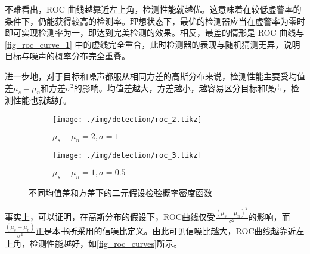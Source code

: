 不难看出，ROC 曲线越靠近左上角，检测性能就越优。这意味着在较低虚警率的条件下，仍能获得较高的检测率。理想状态下，最优的检测器应当在虚警率为零时即可实现检测率为一，即达到完美检测的效果。相反，最差的情形是 ROC 曲线与 \cref{fig_roc_curve_1} 中的虚线完全重合，此时检测器的表现与随机猜测无异，说明目标与噪声的概率分布完全重叠。

进一步地，对于目标和噪声都服从相同方差的高斯分布来说，检测性能主要受均值差\( \mu_s - \mu_n \)和方差\(\sigma^2\)的影响。均值差越大，方差越小，越容易区分目标和噪声，检测性能也就越好。

\begin{figure}[htb!]
    \centering
    \begin{subfigure}{.4\textwidth}
        \centering
        \texttt{[image: ./img/detection/roc\_2.tikz]}
        \caption{\( \mu_s - \mu_n = 2, \sigma = 1 \)}
        \label{fig_dect_prob_2_1}
    \end{subfigure}
    \begin{subfigure}{.4\textwidth}
        \centering
        \texttt{[image: ./img/detection/roc\_3.tikz]}
        \caption{\( \mu_s - \mu_n = 1, \sigma = 0.5 \)}
        \label{fig_dect_prob_2_2}
    \end{subfigure}
    \caption{不同均值差和方差下的二元假设检验概率密度函数}
    \label{fig_dect_prob_2}
\end{figure}

事实上，可以证明，在高斯分布的假设下，ROC曲线仅受\( \frac{(\mu_s - \mu_n)^2}{\sigma^2} \)的影响，而\( \frac{(\mu_s - \mu_n)}{\sigma^2} \)正是本书所采用的信噪比定义。由此可见信噪比越大，ROC曲线越靠近左上角，检测性能越好，如\cref{fig_roc_curves}所示。

